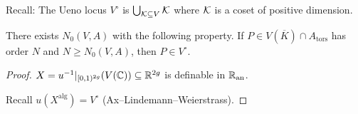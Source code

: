 \documentclass{beamer}
\begin{document}
\begin{frame}
  Recall: The \alert{Ueno locus} $V^{\circ}$  is $\bigcup_{{\mathcal K}\subseteq V} {\mathcal K}$ where ${\mathcal K}$ is
  a coset of positive dimension. 


  \begin{lemma}
    There exists $N_0(V,A)$ with the following property. If
    $P\in V(\overline K)\cap A_{\mathrm{tors}}$ has order $N$
    and $N\ge N_0(V,A)$, then $P\in V^{\circ}$.
  \end{lemma}
  \begin{proof}\renewcommand{\qedsymbol}{}
    $X =  u^{-1}|_{[0,1)^{2g}}(V({\mathbb{C}})) \subseteq {\mathbb{R}}^{2g}$
    is definable in ${{\mathbb{R}}_{\mathrm{an}}}$.

    Recall $ u(X^{\mathrm{alg}}) = V^{\circ}$ (Ax--Lindemann--Weierstrass).

    \vspace{3cm}



  \end{proof}
\end{frame}
\end{document}
